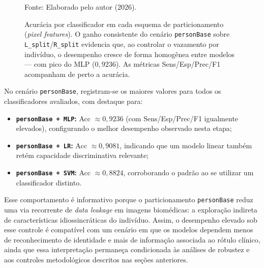 \documentclass[11pt,a4paper]{article}
\begin{document}
\begin{figure}[H]
\centering
{}
\caption{Acur\'acia por classificador em cada esquema de particionamento (\textit{pixel features}). O ganho consistente do cen\'ario \texttt{personBase} sobre \texttt{L\_split}/\texttt{R\_split} evidencia que, ao controlar o vazamento por indiv\'iduo, o desempenho cresce de forma homog\^enea entre modelos --- com pico do MLP ($0{,}9236$). As m\'etricas Sens/Esp/Prec/F1 acompanham de perto a acur\'acia.}
\label{fig:acc-datasets}
{\footnotesize Fonte: Elaborado pelo autor (2026).}
\end{figure}

No cenário \texttt{personBase}, registram-se os maiores valores para todos os classificadores avaliados, com destaque para:
\begin{itemize}
    \item \textbf{\texttt{personBase + MLP}:} Acc \(\approx 0{,}9236\) (com Sens/Esp/Prec/F1 igualmente elevados), configurando o melhor desempenho observado nesta etapa;
    \item \textbf{\texttt{personBase + LR}:} Acc \(\approx 0{,}9081\), indicando que um modelo linear também retém capacidade discriminativa relevante;
    \item \textbf{\texttt{personBase + SVM}:} Acc \(\approx 0{,}8824\), corroborando o padrão ao se utilizar um classificador distinto.
\end{itemize}

Esse comportamento é informativo porque o particionamento \texttt{personBase} reduz uma via recorrente de \textit{data leakage} em imagens biomédicas: a exploração indireta de características idiossincráticas do indivíduo. Assim, o desempenho elevado sob esse controle é compatível com um cenário em que os modelos dependem menos de reconhecimento de identidade e mais de informação associada ao rótulo clínico, ainda que essa interpretação permaneça condicionada às análises de robustez e aos controles metodológicos descritos nas seções anteriores.
\end{document}
